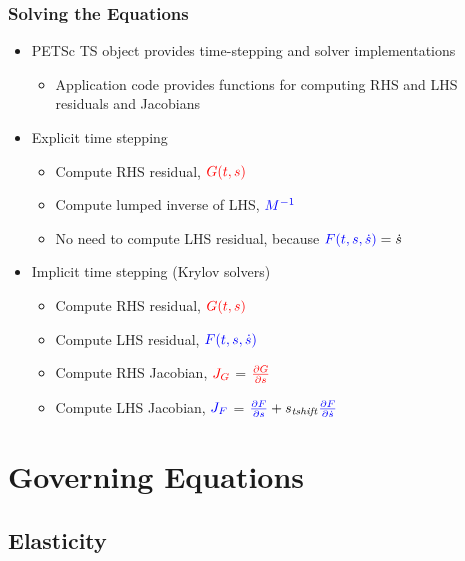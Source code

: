 \documentclass[aspectratio=169]{beamer}
\begin{document}
\begin{frame}
  \frametitle{Solving the Equations}

  \begin{itemize}
  \item PETSc TS object provides time-stepping and solver implementations
    \begin{itemize}
    \item Application code provides functions for computing RHS and LHS residuals and Jacobians
    \end{itemize}
  \item Explicit time stepping
    \begin{itemize}
    \item Compute RHS residual, ${\color{red}G(t,s)}$
    \item Compute lumped inverse of LHS, ${\color{blue}M^{-1}}$
    \item No need to compute LHS residual, because ${\color{blue}F(t,s,\dot{s})} = \dot{s}$
    \end{itemize}
  \item Implicit time stepping (Krylov solvers)
    \begin{itemize}
    \item Compute RHS residual, ${\color{red}G(t,s)}$
    \item Compute LHS residual, ${\color{blue}F(t,s,\dot{s})}$
    \item Compute RHS Jacobian, ${\color{red}J_G}$ = ${\color{red}\frac{\partial G}{\partial s}}$
    \item Compute LHS Jacobian, ${\color{blue}J_F}$ = ${\color{blue}\frac{\partial F}{\partial s}} + s_\mathit{tshift}{\color{blue}\frac{\partial F}{\partial \dot{s}}}$
    \end{itemize}
  \end{itemize}

\end{frame}

\section{Governing Equations}
\subsection{Elasticity}
\end{document}
